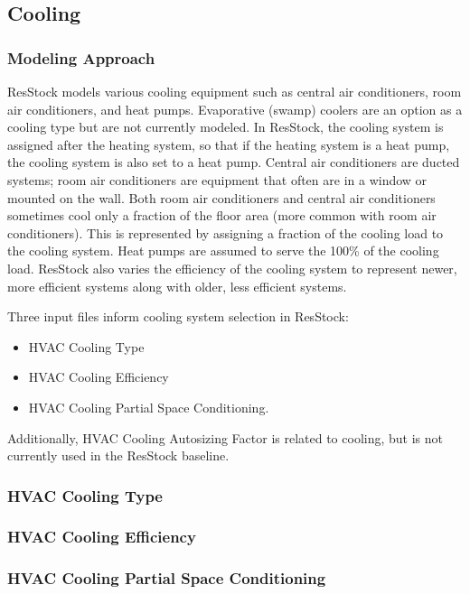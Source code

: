\subsection{Cooling}
\subsubsection{Modeling Approach}
ResStock models various cooling equipment such as central air conditioners, room air conditioners, and heat pumps. Evaporative (swamp) coolers are an option as a cooling type but are not currently modeled. In ResStock, the cooling system is assigned after the heating system, so that if the heating system is a heat pump, the cooling system is also set to a heat pump. Central air conditioners are ducted systems; room air conditioners are equipment that often are in a window or mounted on the wall. Both room air conditioners and central air conditioners sometimes cool only a fraction of the floor area (more common with room air conditioners). This is represented by assigning a fraction of the cooling load to the cooling system. Heat pumps are assumed to serve the 100\% of the cooling load. ResStock also varies the efficiency of the cooling system to represent newer, more efficient systems along with older, less efficient systems.

Three input files inform cooling system selection in ResStock:
\begin{itemize}
    \item HVAC Cooling Type
    \item HVAC Cooling Efficiency
    \item HVAC Cooling Partial Space Conditioning.
\end{itemize}

Additionally, HVAC Cooling Autosizing Factor is related to cooling, but is not currently used in the ResStock baseline.

\subsubsection{HVAC Cooling Type}


\subsubsection{HVAC Cooling Efficiency}


\subsubsection{HVAC Cooling Partial Space Conditioning}


